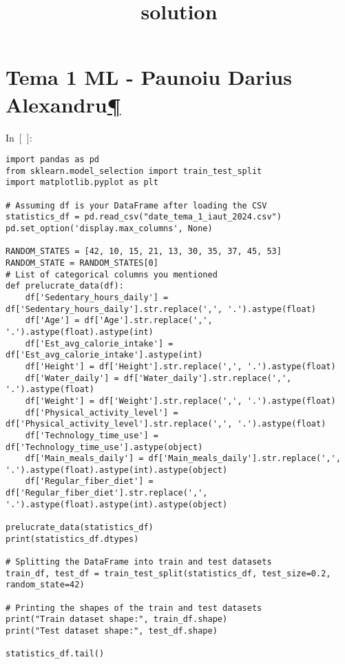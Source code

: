 \documentclass[
  english,
]{article}
\title{solution}
\author{}
\date{}
\begin{document}
\maketitle

\hypertarget{Tema-1-ML---Paunoiu-Darius-Alexandru}{%
\section{\texorpdfstring{Tema 1 ML - Paunoiu Darius
Alexandru\protect\hyperlink{Tema-1-ML---Paunoiu-Darius-Alexandru}{¶}}{Tema 1 ML - Paunoiu Darius Alexandru¶}}\label{Tema-1-ML---Paunoiu-Darius-Alexandru}}

In~{[}~{]}:

\begin{verbatim}
import pandas as pd
from sklearn.model_selection import train_test_split
import matplotlib.pyplot as plt

# Assuming df is your DataFrame after loading the CSV
statistics_df = pd.read_csv("date_tema_1_iaut_2024.csv")
pd.set_option('display.max_columns', None)

RANDOM_STATES = [42, 10, 15, 21, 13, 30, 35, 37, 45, 53]
RANDOM_STATE = RANDOM_STATES[0]
# List of categorical columns you mentioned
def prelucrate_data(df):
    df['Sedentary_hours_daily'] = df['Sedentary_hours_daily'].str.replace(',', '.').astype(float)
    df['Age'] = df['Age'].str.replace(',', '.').astype(float).astype(int)
    df['Est_avg_calorie_intake'] = df['Est_avg_calorie_intake'].astype(int)
    df['Height'] = df['Height'].str.replace(',', '.').astype(float)
    df['Water_daily'] = df['Water_daily'].str.replace(',', '.').astype(float)
    df['Weight'] = df['Weight'].str.replace(',', '.').astype(float)
    df['Physical_activity_level'] = df['Physical_activity_level'].str.replace(',', '.').astype(float)
    df['Technology_time_use'] = df['Technology_time_use'].astype(object)
    df['Main_meals_daily'] = df['Main_meals_daily'].str.replace(',', '.').astype(float).astype(int).astype(object)
    df['Regular_fiber_diet'] = df['Regular_fiber_diet'].str.replace(',', '.').astype(float).astype(int).astype(object)

prelucrate_data(statistics_df)
print(statistics_df.dtypes)

# Splitting the DataFrame into train and test datasets
train_df, test_df = train_test_split(statistics_df, test_size=0.2, random_state=42)

# Printing the shapes of the train and test datasets
print("Train dataset shape:", train_df.shape)
print("Test dataset shape:", test_df.shape)

statistics_df.tail()
\end{verbatim}
\end{document}
